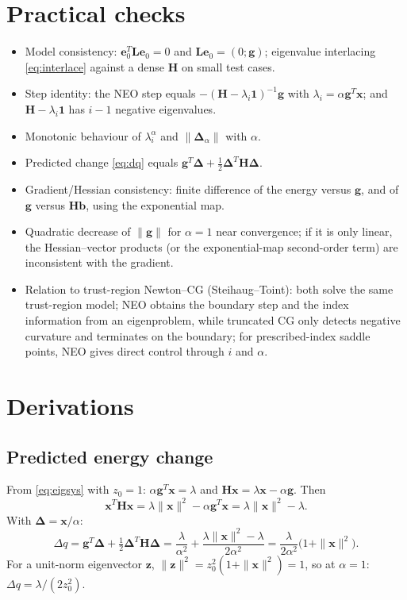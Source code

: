 \documentclass[11pt,a4paper]{article}
\newcommand{\bH}{\mathbf{H}}
\newcommand{\bL}{\mathbf{L}}
\newcommand{\bg}{\mathbf{g}}
\newcommand{\bx}{\mathbf{x}}
\newcommand{\bz}{\mathbf{z}}
\newcommand{\bb}{\mathbf{b}}
\newcommand{\be}{\mathbf{e}}
\newcommand{\bd}{\boldsymbol{\Delta}}
\newcommand{\bone}{\mathbf{1}}
\begin{document}
\section{Practical checks}
\begin{itemize}[nosep]
 \item Model consistency: $\be_0^T\bL\be_0=0$ and $\bL\be_0=(0;\bg)$; eigenvalue interlacing \eqref{eq:interlace} against a dense $\bH$ on small test cases.
 \item Step identity: the NEO step equals $-(\bH-\lambda_i\bone)^{-1}\bg$ with $\lambda_i=\alpha\bg^T\bx$; and $\bH-\lambda_i\bone$ has $i-1$ negative eigenvalues.
 \item Monotonic behaviour of $\lambda_i^\alpha$ and $\|\bd_\alpha\|$ with $\alpha$.
 \item Predicted change \eqref{eq:dq} equals $\bg^T\bd+\tfrac12\bd^T\bH\bd$.
 \item Gradient/Hessian consistency: finite difference of the energy versus $\bg$, and of $\bg$ versus $\bH\bb$, using the exponential map.
 \item Quadratic decrease of $\|\bg\|$ for $\alpha=1$ near convergence; if it is only linear, the Hessian--vector products (or the exponential-map second-order term) are inconsistent with the gradient.
 \item Relation to trust-region Newton--CG (Steihaug--Toint): both solve the same trust-region model; NEO obtains the boundary step and the index information from an eigenproblem, while truncated CG only detects negative curvature and terminates on the boundary; for prescribed-index saddle points, NEO gives direct control through $i$ and $\alpha$.
\end{itemize}

\appendix
\section{Derivations}
\subsection{Predicted energy change}\label{app:dq}
From \eqref{eq:eigsys} with $z_0=1$: $\alpha\bg^T\bx=\lambda$ and $\bH\bx=\lambda\bx-\alpha\bg$. Then
\begin{equation}
 \bx^T\bH\bx=\lambda\|\bx\|^2-\alpha\bg^T\bx=\lambda\|\bx\|^2-\lambda .
\end{equation}
With $\bd=\bx/\alpha$:
\begin{equation}
 \Delta q=\bg^T\bd+\tfrac12\bd^T\bH\bd=\frac{\lambda}{\alpha^2}+\frac{\lambda\|\bx\|^2-\lambda}{2\alpha^2}=\frac{\lambda}{2\alpha^2}\big(1+\|\bx\|^2\big).
\end{equation}
For a unit-norm eigenvector $\bz$, $\|\bz\|^2=z_0^2(1+\|\bx\|^2)=1$, so at $\alpha=1$: $\Delta q=\lambda/(2z_0^2)$.
\end{document}
